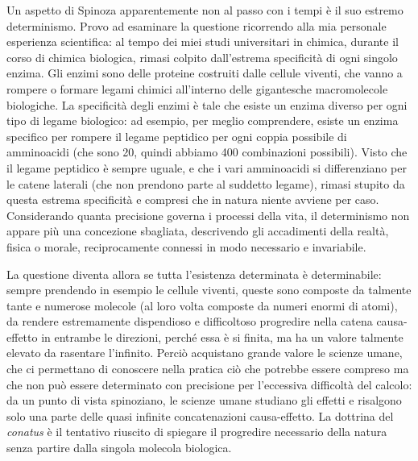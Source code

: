Un aspetto di Spinoza apparentemente non al passo con i tempi è il suo estremo determinismo. Provo ad esaminare la questione ricorrendo alla mia personale esperienza scientifica: al tempo dei miei studi universitari in chimica, durante il corso di chimica biologica, rimasi colpito dall'estrema specificità di ogni singolo enzima. Gli enzimi sono delle proteine costruiti dalle cellule viventi, che vanno a rompere o formare legami chimici all'interno delle gigantesche macromolecole biologiche. La specificità degli enzimi è tale che esiste un enzima diverso per ogni tipo di legame biologico: ad esempio, per meglio comprendere, esiste un enzima specifico per rompere il legame peptidico per ogni coppia possibile di amminoacidi (che sono 20, quindi abbiamo 400 combinazioni possibili). Visto che il legame peptidico è sempre uguale, e che i vari amminoacidi si differenziano per le catene laterali (che non prendono parte al suddetto legame), rimasi stupito da questa estrema specificità e compresi che in natura niente avviene per caso. Considerando quanta precisione  governa i processi della vita, il determinismo  non appare più una concezione sbagliata, descrivendo gli accadimenti della realtà, fisica o morale, reciprocamente connessi in modo necessario e invariabile.

La questione diventa allora se tutta l'esistenza determinata è determinabile: sempre prendendo in esempio le cellule viventi, queste sono composte da talmente tante e numerose molecole (al loro volta composte da numeri enormi di atomi), da rendere estremamente dispendioso e difficoltoso progredire nella catena causa-effetto in entrambe le direzioni, perché essa è si finita, ma ha un valore talmente elevato da rasentare l'infinito. Perciò acquistano grande valore le scienze umane, che ci permettano di conoscere nella pratica ciò che potrebbe essere compreso ma che non può essere determinato con precisione per l'eccessiva difficoltà del calcolo: da un punto di vista spinoziano, le scienze umane studiano gli effetti e risalgono solo una parte delle quasi infinite concatenazioni causa-effetto. La dottrina del \textit{conatus} è il tentativo riuscito di spiegare il progredire necessario della natura senza partire dalla singola molecola biologica.

